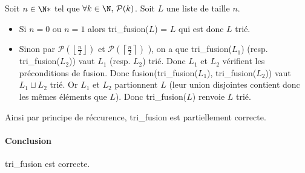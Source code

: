 Soit $n \in \N*$ tel que $\forall k \in \N, \, \mathcal P (k)$. Soit $L$ une liste de taille $n$.

\begin{itemize}[label=$\star$]
	\item Si $n = 0$ ou $n=1$ alors tri\_fusion($L$) = $L$ qui est donc $L$ trié.
	\item Sinon par $\mathcal P(\left\lfloor\frac n 2\right\rfloor)$ et $\mathcal P(\left\lceil\frac n 2\right\rceil)$ ), on a que tri\_fusion($L_1$) (resp. tri\_fusion($L_2$)) vaut $L_1$ (resp. $L_2$) trié. Donc $L_1$ et $L_2$ vérifient les préconditions de fusion. Donc fusion(tri\_fusion($L_1$), tri\_fusion($L_2$)) vaut $L_1 \sqcup L_2$ trié. Or $L_1$ et $L_2$ partionnent $L$ (leur union disjointes contient donc les mêmes éléments que $L$). Donc tri\_fusion($L$) renvoie $L$ trié.
\end{itemize}

Ainsi par principe de réccurence, tri\_fusion est partiellement correcte.

\paragraph{Conclusion} tri\_fusion est correcte.